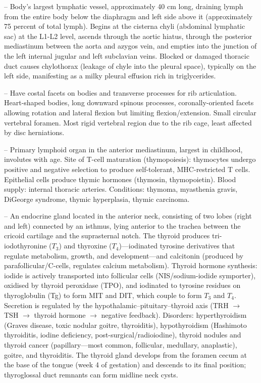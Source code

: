 -- Body's largest lymphatic vessel, approximately 40 cm long, draining lymph from the entire body below the diaphragm and left side above it (approximately 75 percent of total lymph). Begins at the cisterna chyli (abdominal lymphatic sac) at the L1-L2 level, ascends through the aortic hiatus, through the posterior mediastinum between the aorta and azygos vein, and empties into the junction of the left internal jugular and left subclavian veins. Blocked or damaged thoracic duct causes chylothorax (leakage of chyle into the pleural space), typically on the left side, manifesting as a milky pleural effusion rich in triglycerides.

-- Have costal facets on bodies and transverse processes for rib articulation. Heart-shaped bodies, long downward spinous processes, coronally-oriented facets allowing rotation and lateral flexion but limiting flexion/extension. Small circular vertebral foramen. Most rigid vertebral region due to the rib cage, least affected by disc herniations.

-- Primary lymphoid organ in the anterior mediastinum, largest in childhood, involutes with age. Site of T-cell maturation (thymopoiesis): thymocytes undergo positive and negative selection to produce self-tolerant, MHC-restricted T cells. Epithelial cells produce thymic hormones (thymosin, thymopoietin). Blood supply: internal thoracic arteries. Conditions: thymoma, myasthenia gravis, DiGeorge syndrome, thymic hyperplasia, thymic carcinoma.

-- An endocrine gland located in the anterior neck, consisting of two lobes (right and left) connected by an isthmus, lying anterior to the trachea between the cricoid cartilage and the suprasternal notch. The thyroid produces tri-iodothyronine ($T_3$) and thyroxine ($T_4$)—iodinated tyrosine derivatives that regulate metabolism, growth, and development—and calcitonin (produced by parafollicular/C-cells, regulates calcium metabolism). Thyroid hormone synthesis: iodide is actively transported into follicular cells (NIS/sodium-iodide symporter), oxidised by thyroid peroxidase (TPO), and iodinated to tyrosine residues on thyroglobulin (Tg) to form MIT and DIT, which couple to form $T_3$ and $T_4$. Secretion is regulated by the hypothalamic–pituitary–thyroid axis (TRH $\rightarrow$ TSH $\rightarrow$ thyroid hormone $\rightarrow$ negative feedback). Disorders: hyperthyroidism (Graves disease, toxic nodular goitre, thyroiditis), hypothyroidism (Hashimoto thyroiditis, iodine deficiency, post-surgical/radioiodine), thyroid nodules and thyroid cancer (papillary—most common, follicular, medullary, anaplastic), goitre, and thyroiditis. The thyroid gland develops from the foramen cecum at the base of the tongue (week 4 of gestation) and descends to its final position; thyroglossal duct remnants can form midline neck cysts.

